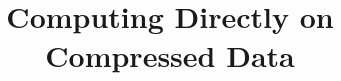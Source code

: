 \documentclass[preprint,nocopyrightspace]{sigplanconf}
\begin{document}


\title{Computing Directly on Compressed Data}

\authorinfo{}


\maketitle

\begin{abstract}

\end{abstract}







%


%



\end{document}
